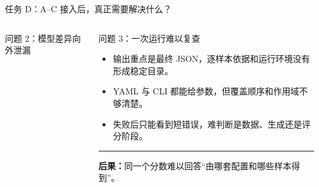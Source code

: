 \documentclass[aspectratio=169,10pt]{beamer}
\begin{document}
\begin{frame}{任务 D：A--C 接入后，真正需要解决什么？}
\begin{columns}[T,onlytextwidth]
\begin{block}{问题 2：模型差异向外泄漏}
      \end{block}
      \begin{block}{问题 3：一次运行难以复查}
        \begin{minipage}[c][4.65cm][c]{\linewidth}
          \begin{itemize}\scriptsize
            \item 输出重点是最终 JSON，逐样本依据和运行环境没有形成稳定目录。
            \item YAML 与 CLI 都能给参数，但覆盖顺序和作用域不够清楚。
            \item 失败后只能看到短错误，难判断是数据、生成还是评分阶段。
          \end{itemize}
          \vspace{0.35em}
          \color{T2IGray}\rule{\linewidth}{0.35pt}\par\vspace{0.25em}
          \scriptsize\textbf{后果：}同一个分数难以回答“由哪套配置和哪些样本得到”。
        \end{minipage}
      \end{block}
  \end{columns}
\end{frame}
\end{document}
